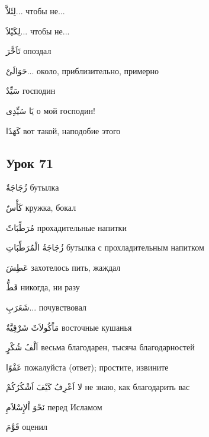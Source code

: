 \documentclass[a5paper]{article}
\newcommand\textstyleDropCaps[1]{#1}
\newcommand\textstyleCaptioncharacters[1]{#1}
\begin{document}
\textstyleCaptioncharacters{لِئَلاَّ... }\textstyleDropCaps{чтобы не...‎}

\textstyleCaptioncharacters{لِكَيْلاَ... }\textstyleDropCaps{чтобы не...‎}

\textstyleCaptioncharacters{تَاَخَّرَ }\textstyleDropCaps{опоздал‎}

\textstyleCaptioncharacters{حَوَالَىْ... }\textstyleDropCaps{около, прибли­зительно, примерно‎}

\textstyleCaptioncharacters{سَيِّدٌ }\textstyleDropCaps{господин‎}

\textstyleCaptioncharacters{يَا سَيِّدِى }\textstyleDropCaps{о мой госпо­дин!‎}

\textstyleCaptioncharacters{كَهَذَا }\textstyleDropCaps{вот такой, наподо­бие этого‎}

\subsection[Урок 71‎]{\textstyleDropCaps{Урок 71‎}}
\textstyleCaptioncharacters{زُجَاجَةٌ }\textstyleDropCaps{бутылка‎}

\textstyleCaptioncharacters{كَأْسٌ }\textstyleDropCaps{кружка, бокал‎}

\textstyleCaptioncharacters{مُرَطِّبَاتٌ }\textstyleDropCaps{прохадитель­ные напитки‎}

\textstyleCaptioncharacters{زُجَاجَةُ الْمُرَطِّبَاتِ }\textstyleDropCaps{бу­тылка с прохладительным напитком‎}

\textstyleCaptioncharacters{عَطِشَ }\textstyleDropCaps{захотелось пить, жаждал‎}

\textstyleCaptioncharacters{قَطُّ }\textstyleDropCaps{никогда, ни разу‎}

\textstyleCaptioncharacters{شَعَرَبِ...ِ }\textstyleDropCaps{почувствовал‎}

\textstyleCaptioncharacters{مَاْكُولاَتٌ شَرْقِيَّةٌ }\textstyleDropCaps{вос­точные кушанья‎}

\textstyleCaptioncharacters{اَلْفُ شُكْرٍ }\textstyleDropCaps{весьма благо­дарен, тысяча благодарностей‎}

\textstyleCaptioncharacters{عَفْوًا }\textstyleDropCaps{пожалуйста (ответ); простите, извините‎}

\textstyleCaptioncharacters{لا اَعْرِفُ كَيْفَ اَشْكُرُكُمْ }\textstyleDropCaps{не знаю, как благодарить вас‎}

\textstyleCaptioncharacters{نَحْوَ اْلإِسْلاَمِ }\textstyleDropCaps{перед Исла­мом‎}

\textstyleCaptioncharacters{قَوَّمَ }\textstyleDropCaps{оценил‎}
\end{document}
